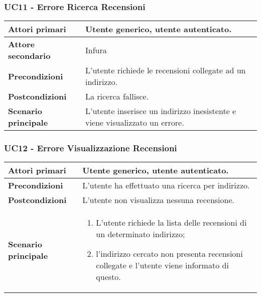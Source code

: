 \subsubsection{UC11 - Errore Ricerca Recensioni}
\label{UC11}
\begin{center}
\renewcommand{\arraystretch}{1.5}
\begin{tabular}{ | m{10em} | m{20em} | }
    \hline
    \textbf{Attori primari} & Utente generico, utente autenticato. \\
    \hline
    \textbf{Attore secondario} & Infura \\
    \hline
    \textbf{Precondizioni} & L'utente richiede le recensioni collegate ad un indirizzo. \\
    \hline
    \textbf{Postcondizioni} & La ricerca fallisce. \\
    \hline
    \textbf{Scenario principale} & L'utente inserisce un indirizzo inesistente e viene visualizzato un errore. \\
    \hline
   \end{tabular}
\end{center}

\subsubsection{UC12 - Errore Visualizzazione Recensioni}
\label{UC12}
\begin{center}
\renewcommand{\arraystretch}{1.5}
\begin{tabular}{ | m{10em} | m{20em} | }
    \hline
    \textbf{Attori primari} & Utente generico, utente autenticato. \\
    \hline
    \textbf{Precondizioni} & L'utente ha effettuato una ricerca per indirizzo. \\
    \hline
    \textbf{Postcondizioni} & L'utente non visualizza nessuna recensione. \\
    \hline
    \textbf{Scenario principale} & \begin{enumerate}
        \item L'utente richiede la lista delle recensioni di un determinato indirizzo;
    \item l'indirizzo cercato non presenta recensioni collegate e l'utente viene
          informato di questo.
    \end{enumerate} \\
    \hline
   \end{tabular}
\end{center}

